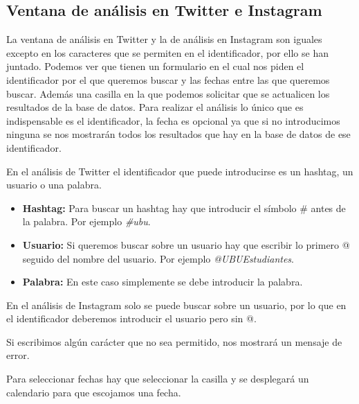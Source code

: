 \subsection{Ventana de análisis en Twitter e Instagram}
La ventana de análisis en Twitter y la de análisis en Instagram son iguales excepto en los caracteres que se permiten en el identificador, por ello se han juntado.
Podemos ver que tienen un formulario en el cual nos piden el identificador por el que queremos buscar y las fechas entre las que queremos buscar. Además una casilla en la que podemos solicitar que se actualicen los resultados de la base de datos.
Para realizar el análisis lo único que es indispensable es el identificador, la fecha es opcional ya que si no introducimos ninguna se nos mostrarán todos los resultados que hay en la base de datos de ese identificador.



En el análisis de Twitter el identificador que puede introducirse es un hashtag, un usuario o una palabra.
\begin{itemize}
\tightlist
    \item \textbf{Hashtag:} Para buscar un hashtag hay que introducir el símbolo \# antes de la palabra. Por ejemplo \textit{\#ubu}. 
    \item \textbf{Usuario:} Si queremos buscar sobre un usuario hay que escribir lo primero @ seguido del nombre del usuario. Por ejemplo \textit{@UBUEstudiantes}.
    \item\textbf{Palabra:} En este caso simplemente se debe introducir la palabra. 
\end{itemize}
En el análisis de Instagram solo se puede buscar sobre un usuario, por lo que en el identificador deberemos introducir el usuario pero sin @.


Si escribimos algún carácter que no sea permitido, nos mostrará un mensaje de error.


Para seleccionar fechas hay que seleccionar la casilla y se desplegará un calendario para que escojamos una fecha.

